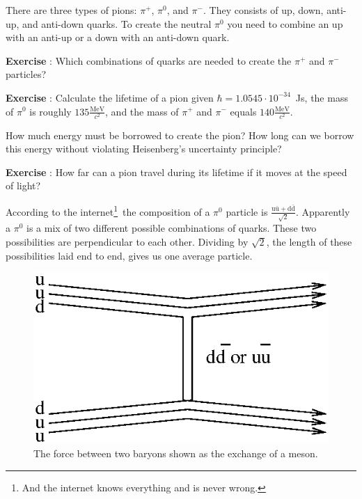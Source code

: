 \documentclass[12pt,a4paper]{article}
\numberwithin{equation}{section}
\numberwithin{figure}{section}
\newcounter{Exercise}
\numberwithin{table}{section}
\begin{document}
There are three types of pions: $\pi^+$, $\pi^0$, and $\pi^-$. They consists of up, down, anti-up, and anti-down quarks. To create the neutral $\pi^0$ you need to combine an up with an anti-up or a down with an anti-down quark.

\begin{shaded}
\textbf{Exercise \theExercise {}} : Which combinations of quarks are needed to create the $\pi^+$ and $\pi^-$ particles?\footnotemark\end{shaded}
\begin{shaded}
\textbf{Exercise \theExercise {}} : Calculate the lifetime of a pion given $\hbar=1.0545 \cdot 10^{-34}$~Js, the mass of $\pi^0$ is roughly $135 \frac{\mbox{MeV}}{c^2}$, and the mass of $\pi^+$ and  $\pi^-$ equals $140 \frac{\mbox{MeV}}{c^2}$.

How much energy must be borrowed to create the pion? How long can we borrow this energy without violating Heisenberg's uncertainty principle?\end{shaded}
\begin{shaded}
\textbf{Exercise \theExercise {}} : How far can a pion travel during its lifetime if it moves at the speed of light?\end{shaded}

According to the internet\footnote{And the internet knows everything and is never wrong.}~the composition of a $\pi^0$ particle is $\frac{\mbox{u}\bar{\mbox{u}}+\mbox{d}\bar{\mbox{d}}}{\sqrt{2}}$. Apparently a $\pi^0$ is a mix of two different possible combinations of quarks. These two possibilities are perpendicular to each other. Dividing by $\sqrt{2}$, the length of these possibilities laid end to end, gives us one average particle.

\begin{figure}\begin{center}
\includegraphics[scale=1]{meson_exchange.eps}%
\caption{The force between two baryons shown as the exchange of a meson.}\label{fig:meson_exchange}
\end{center}\end{figure}
\end{document}
